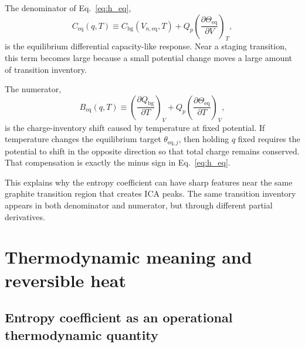 \documentclass[11pt,a4paper]{article}
\newcommand{\eqs}{\mathrm{eq}}
\newcommand{\bg}{\mathrm{bg}}
\begin{document}
The denominator of Eq.~\eqref{eq:h_eq},
\begin{equation}
C_{\eqs}(q,T)
\equiv
C_{\bg}(V_{n,\eqs},T)
+Q_p\left(\frac{\partial\Theta_{\eqs}}{\partial V}\right)_T,
\label{eq:Ceq}
\end{equation}
is the equilibrium differential capacity-like response. Near a staging transition, this term becomes large
because a small potential change moves a large amount of transition inventory.

The numerator,
\begin{equation}
B_{\eqs}(q,T)
\equiv
\left(\frac{\partial Q_{\bg}}{\partial T}\right)_V
+Q_p\left(\frac{\partial\Theta_{\eqs}}{\partial T}\right)_V,
\label{eq:Beq}
\end{equation}
is the charge-inventory shift caused by temperature at fixed potential. If temperature changes the equilibrium
target \(\theta_{\eqs,j}\), then holding \(q\) fixed requires the potential to shift in the opposite direction
so that total charge remains conserved. That compensation is exactly the minus sign in Eq.~\eqref{eq:h_eq}.

This explains why the entropy coefficient can have sharp features near the same graphite transition region
that creates ICA peaks. The same transition inventory appears in both denominator and numerator, but through
different partial derivatives.

\section{Thermodynamic meaning and reversible heat}\label{sec:rev_heat}

\subsection{Entropy coefficient as an operational thermodynamic quantity}\label{sec:entropy_coeff}
\end{document}
